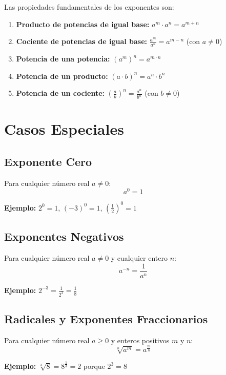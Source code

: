 \begin{teoria}
Las propiedades fundamentales de los exponentes son:

\begin{enumerate}
\item \textbf{Producto de potencias de igual base:} $a^m \cdot a^n = a^{m+n}$
\item \textbf{Cociente de potencias de igual base:} $\frac{a^m}{a^n} = a^{m-n}$ (con $a \neq 0$)
\item \textbf{Potencia de una potencia:} $(a^m)^n = a^{m \cdot n}$
\item \textbf{Potencia de un producto:} $(a \cdot b)^n = a^n \cdot b^n$
\item \textbf{Potencia de un cociente:} $\left(\frac{a}{b}\right)^n = \frac{a^n}{b^n}$ (con $b \neq 0$)
\end{enumerate}


\section{Casos Especiales}

\subsection{Exponente Cero}

Para cualquier número real $a \neq 0$:
$$a^0 = 1$$

\textbf{Ejemplo:} $2^0 = 1$, $(-3)^0 = 1$, $\left(\frac{1}{2}\right)^0 = 1$

\subsection{Exponentes Negativos}

Para cualquier número real $a \neq 0$ y cualquier entero $n$:
$$a^{-n} = \frac{1}{a^n}$$

\textbf{Ejemplo:} $2^{-3} = \frac{1}{2^3} = \frac{1}{8}$

\subsection{Radicales y Exponentes Fraccionarios}

Para cualquier número real $a \geq 0$ y enteros positivos $m$ y $n$:
$$\sqrt[n]{a^m} = a^{\frac{m}{n}}$$

\textbf{Ejemplo:} $\sqrt[3]{8} = 8^{\frac{1}{3}} = 2$ porque $2^3 = 8$


\end{teoria}
